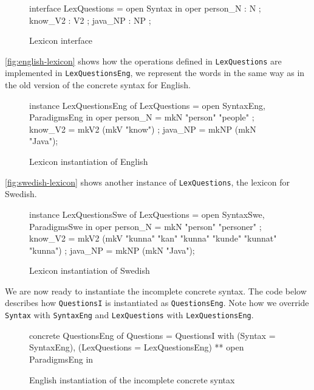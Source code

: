 \begin{figure}[H]
\begin{code}
interface LexQuestions = open Syntax in {
   oper
     person_N : N ;
     know_V2 : V2 ;
     java_NP : NP ;
}
\end{code}
\caption{Lexicon interface\label{fig:lexicon-interface}}
\end{figure}

\autoref{fig:english-lexicon} shows how the operations defined in \texttt{LexQuestions} are implemented in \texttt{LexQuestionsEng}, we represent the words in the same  way as in the old version of the concrete syntax for English.

\begin{figure}[H]
\begin{code}
instance LexQuestionsEng of LexQuestions = open SyntaxEng, ParadigmsEng in {
    oper
      person_N = mkN "person" "people" ;
      know_V2 = mkV2 (mkV "know") ;	  
      java_NP = mkNP (mkN "Java");
}
\end{code}
\caption{Lexicon instantiation of English \label{fig:english-lexicon}}
\end{figure}

\autoref{fig:swedish-lexicon} shows another instance of \texttt{LexQuestions}, the lexicon for Swedish.

\begin{figure}[H]
\begin{code}
instance LexQuestionsSwe of LexQuestions = open SyntaxSwe, ParadigmsSwe in {
    oper
      person_N = mkN "person" "personer" ;
      know_V2 = mkV2 (mkV "kunna" "kan" "kunna" "kunde" "kunnat" "kunna") ;	  
      java_NP = mkNP (mkN "Java");
}
\end{code}
\caption{Lexicon instantiation of Swedish\label{fig:swedish-lexicon}}
\end{figure}

We are now ready to instantiate the incomplete concrete syntax. The code below describes how \texttt{QuestionsI} is instantiated as \texttt{QuestionsEng}. Note how we override \texttt{Syntax} with \texttt{SyntaxEng} and \texttt{LexQuestions} with \texttt{LexQuestionsEng}.

\begin{figure}[H]
\begin{code}
concrete QuestionsEng of Questions = QuestionsI with 
                                             (Syntax = SyntaxEng), 
                                             (LexQuestions = LexQuestionsEng) 
                                             ** open ParadigmsEng in {}
\end{code}
\caption{English instantiation of the incomplete concrete syntax}
\end{figure}

